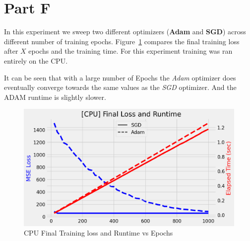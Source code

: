 \newpage
\section{Part F}
\label{sec:sec_f}

In this experiment we sweep two different optimizers (\textbf{Adam} and \textbf{SGD}) across different number of training epochs. Figure~\ref{fig:f} compares the final training loss after $X$ epochs and the training time. For this experiment training was ran entirely on the CPU.


It can be seen that with a large number of Epochs the \textit{Adam} optimizer does eventually converge towards the same values as the \textit{SGD} optimizer. And the ADAM runtime is slightly slower.

\begin{figure}[htpb]
	\centering
	\includegraphics[width=\columnwidth]{figures/cpu_timing.png}
	\caption{CPU Final Training loss and Runtime vs Epochs}
	\label{fig:f}
\end{figure}


